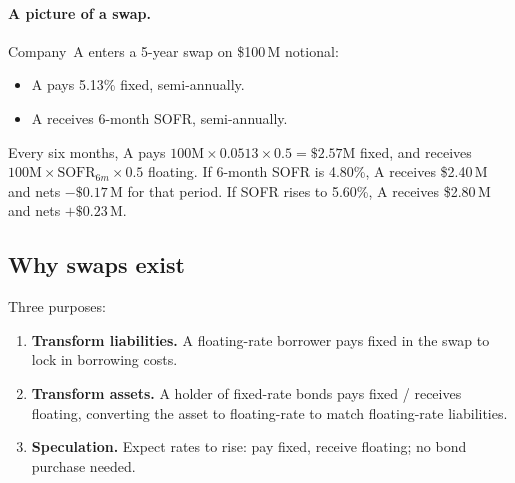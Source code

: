 \paragraph{A picture of a swap.}
\begin{center}
\end{center}

\begin{example}
\label{ex:irs_basic}
Company~A enters a 5-year swap on \$100\,M notional:
\begin{itemize}
  \item A pays 5.13\% fixed, semi-annually.
  \item A receives 6-month SOFR, semi-annually.
\end{itemize}
Every six months, A pays $100\text{M} \times 0.0513 \times 0.5 =
\$2.57\text{M}$ fixed, and receives
$100\text{M} \times \text{SOFR}_{6m} \times 0.5$ floating.
If 6-month SOFR is 4.80\%, A receives \$2.40\,M and nets
$-\$0.17$\,M for that period.  If SOFR rises to 5.60\%, A receives
\$2.80\,M and nets $+\$0.23$\,M.
\end{example}

\subsection{Why swaps exist}

Three purposes:
\begin{enumerate}
  \item \textbf{Transform liabilities.}  A floating-rate borrower
    pays fixed in the swap to lock in borrowing costs.
  \item \textbf{Transform assets.}  A holder of fixed-rate bonds pays
    fixed / receives floating, converting the asset to floating-rate
    to match floating-rate liabilities.
  \item \textbf{Speculation.}  Expect rates to rise: pay fixed,
    receive floating; no bond purchase needed.
\end{enumerate}


